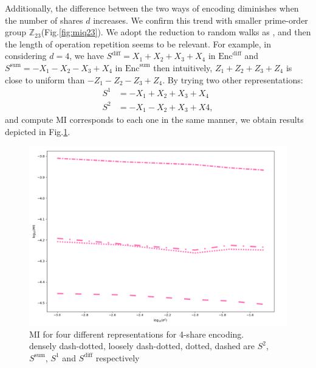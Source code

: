\documentclass{llncs}
\begin{document}
	Additionally, the difference between the two ways of encoding diminishes when the number of shares $d$ increases. We confirm this trend with smaller prime-order group $\mathbb{Z}_{23}$(Fig.\ref{fig:miq23}). We adopt the reduction to random walks as \cite{optimalmask}, and then the length of operation repetition seems to be relevant. For example, in considering $d=4$, we have $S^\text{diff} = X_1 + X_2 + X_3 + X_4$ in $\text{Enc}^{\text{diff}}$  and $S^\text{sum} = -X_1 - X_2 - X_3 + X_4$   in $\text{Enc}^{\text{sum}}$ then intuitively, $Z_1 + Z_2 + Z_3 + Z_4$ is close to uniform than $-Z_1 - Z_2 - Z_3 + Z_4$. By trying two other representations:
	\begin{align*}
		S^1 &= -X_1 + X_2 + X_3 + X_4\\
		S^2 &= -X_1 - X_2 + X_3 + X4,
	\end{align*}
	and compute MI corresponds to each one in the same manner, we obtain results depicted in Fig.\ref{fig:mi_4shares}.
	\begin{figure}[!h]
		\vspace*{-0.0cm}
		\hspace*{0.0cm}\centering \includegraphics[scale=0.2]{figures/4shares_modes.png}
		\vspace*{0.3cm}
		\caption{MI for four different representations for 4-share encoding.\\ densely dash-dotted, loosely dash-dotted, dotted, dashed are $S^2$, $S^{\text{sum}}$, $S^1$ and $S^{\text{diff}}$ respectively}\label{fig:mi_4shares}\vspace*{-0.0cm}
	\end{figure}
	
\end{document}

